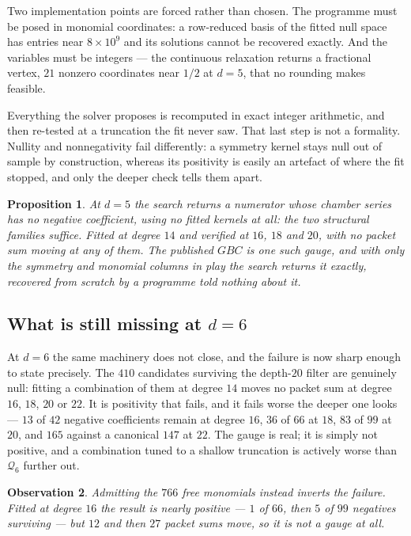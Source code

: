 \documentclass[11pt,a4paper]{article}
\newcommand{\Qd}{\mathcal{Q}}
\theoremstyle{plain}
\newtheorem{proposition}{Proposition}
\newtheorem{observation}[proposition]{Observation}
\theoremstyle{definition}
\theoremstyle{remark}
\begin{document}
Two implementation points are forced rather than chosen. The programme must be posed in
monomial coordinates: a row-reduced basis of the fitted null space has entries near $8\times
10^{9}$ and its solutions cannot be recovered exactly. And the variables must be integers ---
the continuous relaxation returns a fractional vertex, $21$ nonzero coordinates near $1/2$ at
$d = 5$, that no rounding makes feasible.

Everything the solver proposes is recomputed in exact integer arithmetic, and then re-tested
at a truncation the fit never saw. That last step is not a formality. Nullity and
nonnegativity fail differently: a symmetry kernel stays null out of sample by construction,
whereas its positivity is easily an artefact of where the fit stopped, and only the deeper
check tells them apart.

\begin{proposition}
At $d = 5$ the search returns a numerator whose chamber series has no negative coefficient,
using \emph{no fitted kernels at all}: the two structural families suffice. Fitted at degree
$14$ and verified at $16$, $18$ and $20$, with no packet sum moving at any of them. The
published $GBC$ is one such gauge, and with only the symmetry and monomial columns in play the
search returns it exactly, recovered from scratch by a programme told nothing about it.
\end{proposition}

\subsection{What is still missing at \texorpdfstring{$d = 6$}{d = 6}}

At $d = 6$ the same machinery does not close, and the failure is now sharp enough to state
precisely. The $410$ candidates surviving the depth-$20$ filter are genuinely null: fitting a
combination of them at degree $14$ moves no packet sum at degree $16$, $18$, $20$ or $22$. It
is positivity that fails, and it fails worse the deeper one looks --- $13$ of $42$ negative
coefficients remain at degree $16$, $36$ of $66$ at $18$, $83$ of $99$ at $20$, and $165$
against a canonical $147$ at $22$. The gauge is real; it is simply not positive, and a
combination tuned to a shallow truncation is actively worse than $\Qd_6$ further out.

\begin{observation}
Admitting the $766$ free monomials instead inverts the failure. Fitted at degree $16$ the
result is nearly positive --- $1$ of $66$, then $5$ of $99$ negatives surviving --- but $12$
and then $27$ packet sums move, so it is not a gauge at all.
\end{observation}
\end{document}
